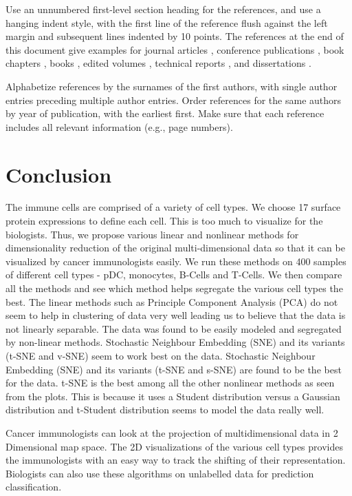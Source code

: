 \documentclass{article}
\begin{document}
Use an unnumbered first-level section heading for the references, and 
use a hanging indent style, with the first line of the reference flush
against the left margin and subsequent lines indented by 10 points. 
The references at the end of this document give examples for journal
articles \cite{Bendall:2011bm}, conference publications \cite{Bendall:2011bm}, book chapters \cite{Bendall:2011bm}, books \cite{Bendall:2011bm}, edited volumes \cite{Bendall:2011bm}, 
technical reports \cite{Crammer:2002uy}, and dissertations \cite{Bendall:2011bm}. 

Alphabetize references by the surnames of the first authors, with
single author entries preceding multiple author entries. Order
references for the same authors by year of publication, with the
earliest first. Make sure that each reference includes all relevant
information (e.g., page numbers).


\section{Conclusion} 

The immune cells are comprised of a variety of cell types. We choose 17 surface protein expressions to define each cell. This is too much to visualize for the biologists. Thus, we propose various linear and nonlinear methods for dimensionality reduction of the original multi-dimensional data so that it can be visualized by cancer immunologists easily. We run these methods on 400 samples of different cell types - pDC, monocytes, B-Cells and T-Cells. We then compare all the methods and see which method helps segregate the various cell types the best. The linear methods such as Principle Component Analysis (PCA) do not seem to help in clustering of data very well leading us to believe that the data is not linearly separable. The data was found to be easily modeled and segregated by non-linear methods. Stochastic Neighbour Embedding (SNE) and its variants (t-SNE and v-SNE) seem to work best on the data. Stochastic Neighbour Embedding (SNE) and its variants (t-SNE and s-SNE) are found to be the best for the data. t-SNE is the best among all the other nonlinear methods as seen from the plots. This is because it uses a Student distribution versus a Gaussian distribution and t-Student distribution seems to model the data really well. 

Cancer immunologists can look at the projection of multidimensional data in 2 Dimensional map space. The 2D visualizations of the various cell types provides the immunologists with an easy way to track the shifting of their representation. Biologists can also use these algorithms on unlabelled data for prediction classification.  
\end{document}
